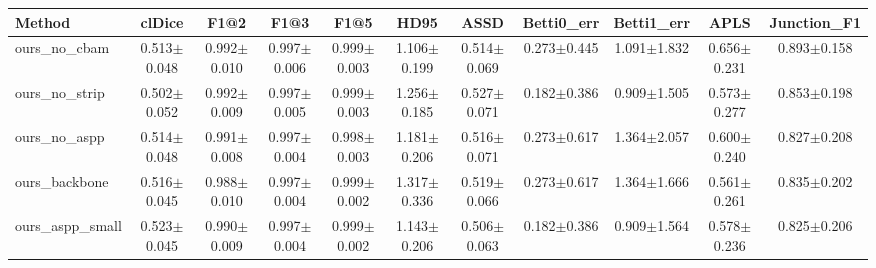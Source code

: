 \begin{tabular}{lcccccccccc}
\toprule
Method & clDice & F1@2 & F1@3 & F1@5 & HD95 & ASSD & Betti0_err & Betti1_err & APLS & Junction_F1 \\
\midrule
ours_no_cbam & 0.513$\pm$0.048 & 0.992$\pm$0.010 & 0.997$\pm$0.006 & 0.999$\pm$0.003 & 1.106$\pm$0.199 & 0.514$\pm$0.069 & 0.273$\pm$0.445 & 1.091$\pm$1.832 & 0.656$\pm$0.231 & 0.893$\pm$0.158 \\
ours_no_strip & 0.502$\pm$0.052 & 0.992$\pm$0.009 & 0.997$\pm$0.005 & 0.999$\pm$0.003 & 1.256$\pm$0.185 & 0.527$\pm$0.071 & 0.182$\pm$0.386 & 0.909$\pm$1.505 & 0.573$\pm$0.277 & 0.853$\pm$0.198 \\
ours_no_aspp & 0.514$\pm$0.048 & 0.991$\pm$0.008 & 0.997$\pm$0.004 & 0.998$\pm$0.003 & 1.181$\pm$0.206 & 0.516$\pm$0.071 & 0.273$\pm$0.617 & 1.364$\pm$2.057 & 0.600$\pm$0.240 & 0.827$\pm$0.208 \\
ours_backbone & 0.516$\pm$0.045 & 0.988$\pm$0.010 & 0.997$\pm$0.004 & 0.999$\pm$0.002 & 1.317$\pm$0.336 & 0.519$\pm$0.066 & 0.273$\pm$0.617 & 1.364$\pm$1.666 & 0.561$\pm$0.261 & 0.835$\pm$0.202 \\
ours_aspp_small & 0.523$\pm$0.045 & 0.990$\pm$0.009 & 0.997$\pm$0.004 & 0.999$\pm$0.002 & 1.143$\pm$0.206 & 0.506$\pm$0.063 & 0.182$\pm$0.386 & 0.909$\pm$1.564 & 0.578$\pm$0.236 & 0.825$\pm$0.206 \\
\bottomrule
\end{tabular}